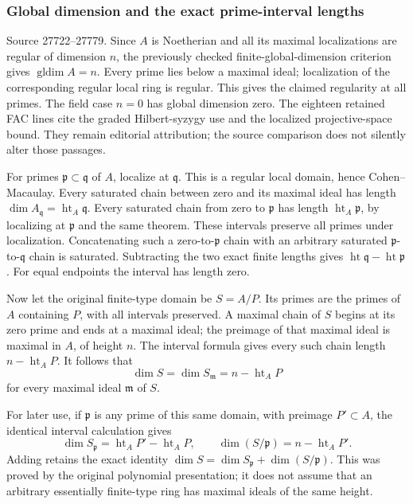 \subsubsection{Global dimension and the exact prime-interval lengths}\label{global-dimension-and-the-exact-prime-interval-lengths}

Source 27722--27779. Since \(A\) is Noetherian and all its maximal localizations are regular of dimension \(n\), the previously checked finite-global-dimension criterion gives \(\operatorname{gldim}A=n\). Every prime lies below a maximal ideal; localization of the corresponding regular local ring is regular. This gives the claimed regularity at all primes. The field case \(n=0\) has global dimension zero. The eighteen retained FAC lines cite the graded Hilbert-syzygy use and the localized projective-space bound. They remain editorial attribution; the source comparison does not silently alter those passages.

For primes \(\mathfrak p\subset\mathfrak q\) of \(A\), localize at \(\mathfrak q\). This is a regular local domain, hence Cohen--Macaulay. Every saturated chain between zero and its maximal ideal has length \(\dim A_{\mathfrak q}=\operatorname{ht}_A\mathfrak q\). Every saturated chain from zero to \(\mathfrak p\) has length \(\operatorname{ht}_A\mathfrak p\), by localizing at \(\mathfrak p\) and the same theorem. These intervals preserve all primes under localization. Concatenating such a zero-to-\(\mathfrak p\) chain with an arbitrary saturated \(\mathfrak p\)-to-\(\mathfrak q\) chain is saturated. Subtracting the two exact finite lengths gives \(\operatorname{ht}\mathfrak q-\operatorname{ht}\mathfrak p\). For equal endpoints the interval has length zero.

Now let the original finite-type domain be \(S=A/P\). Its primes are the primes of \(A\) containing \(P\), with all intervals preserved. A maximal chain of \(S\) begins at its zero prime and ends at a maximal ideal; the preimage of that maximal ideal is maximal in \(A\), of height \(n\). The interval formula gives every such chain length \(n-\operatorname{ht}_A P\). It follows that \[
 \dim S=\dim S_{\mathfrak m}=n-\operatorname{ht}_A P
\] for every maximal ideal \(\mathfrak m\) of \(S\).

For later use, if \(\mathfrak p\) is any prime of this same domain, with preimage \(P'\subset A\), the identical interval calculation gives \[
 \dim S_{\mathfrak p}=\operatorname{ht}_A P'-\operatorname{ht}_A P,
 \qquad
 \dim(S/\mathfrak p)=n-\operatorname{ht}_A P'.
\] Adding retains the exact identity \(\dim S=\dim S_{\mathfrak p}+\dim(S/\mathfrak p)\). This was proved by the original polynomial presentation; it does not assume that an arbitrary essentially finite-type ring has maximal ideals of the same height.


